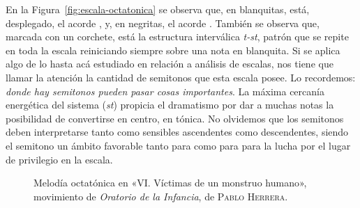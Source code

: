 \documentclass[a4paper,10pt]{article}
\begin{document}
\begin{multicols}{2}
En la Figura~\ref{fig:escala-octatonica} se observa que, en blanquitas, está, desplegado, el acorde , y, en negritas, el acorde \hbox{.} También se observa que, marcada con un corchete, está la estructura interválica \emph{t-st}, patrón que se repite en toda la escala reiniciando siempre sobre una nota en blanquita. Si se aplica algo de lo hasta acá estudiado en relación a análisis de escalas, nos tiene que llamar la atención la cantidad de semitonos que esta escala posee. Lo recordemos: \emph{donde hay semitonos pueden pasar cosas importantes}. La máxima cercanía energética del sistema (\emph{st}) propicia el dramatismo por dar a muchas notas la posibilidad de convertirse en centro, en tónica. No olvidemos que los semitonos deben interpretarse tanto como sensibles ascendentes como descendentes, siendo el semitono  un ámbito favorable tanto para  como para  para la lucha por el lugar de privilegio en la escala.
\end{multicols}

\begin{figure}[ht]
\centering
{}
\caption{Melodía octatónica en «VI. Víctimas de un monstruo humano», movimiento de \emph{Oratorio de la Infancia}, de \textsc{Pablo Herrera}.}\label{fig:melodia-octatonica}
\end{figure}
\end{document}
